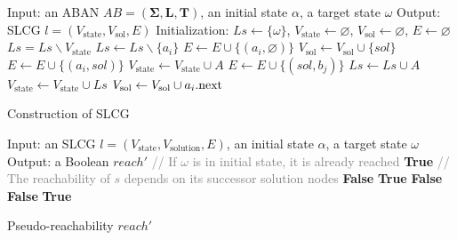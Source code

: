 \documentclass{article}
\theoremstyle{definition}
\newcommand{\st}{{\mathrm{state}}}
\newcommand{\sol}{{\mathrm{sol}}}
\begin{document}
\begin{algorithm}[ht]
\begin{algorithmic}
\State Input: an ABAN $AB=(\mathbf{\Sigma},\mathbf{L},\mathbf{T})$, an initial state $\alpha$, a target state $\omega$
\State Output: SLCG $l=(V_\st,V_\sol, E)$
\State Initialization: 
$Ls\gets \{\omega\}$, $V_\st\gets\varnothing$, $V_\sol\gets \varnothing$, $E\gets \varnothing$
    \State $Ls=Ls\backslash V_\st$
		\State $Ls\gets Ls\backslash \{a_i\}$
			\State $E\gets E\cup \{(a_i,\varnothing)\} $
    	\Else
    		    \State $V_\sol\gets V_\sol\cup \{sol\}$
    		    \State $E\gets E\cup \{(a_i,sol)\} $
    			\State $V_\st\gets V_\st\cup {A}$
    				\State $E\gets E\cup \{(sol,b_j)\} $
    			\EndFor
    			\State $Ls\gets Ls\cup A$
                \State $V_\st\gets V_\st\cup Ls$
    		\EndFor
    		\State$V_\sol\gets V_\sol\cup a_i{\rm .next}$           
    	\EndIf
	\EndFor
\EndWhile
\State\Return{$(V_\st,V_\sol,E)$}
\end{algorithmic}
\caption{Construction of SLCG}\label{AlgConstructLCG}
\end{algorithm}

\begin{algorithm}[ht]
\begin{algorithmic}
\State Input: an SLCG $l=(V_\st, {V_\mathrm{solution}},E)$, an initial state $\alpha$, a target state $\omega$
\State Output: a Boolean $reach'$
\State \textcolor{gray}{// If $\omega$ is in initial state, it is already reached}
\If {$\omega\in \alpha$}
   \Return \textbf{True}
\EndIf
\State \textcolor{gray}{// The reachability of $s$ depends on its successor solution nodes}
    \Return \textbf{False}
\EndIf
{}
    \Return \textbf{True}
    \EndIf
\EndFor
 \Return \textbf{False}
\EndProcedure
{}
    \Return \textbf{False}
    \EndIf
\EndFor
\Return \textbf{True}
\EndProcedure
\end{algorithmic}
\caption{Pseudo-reachability $reach'$}\label{algPseudo}
\end{algorithm}
\end{document}
